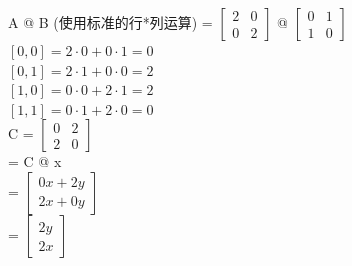 \documentclass[12pt]{article}
\begin{document}
\begin{flushleft}
A @ B (使用标准的行*列运算)
= $\begin{bmatrix}
    2 & 0\\
    0 & 2
\end{bmatrix}$  @ 
$\begin{bmatrix}
    0 & 1 \\
    1 & 0
\end{bmatrix}$ \\
$ [0, 0] = 2 \cdot 0  + 0 \cdot 1 = 0 $ \\
$ [0, 1] = 2 \cdot 1  + 0 \cdot 0 = 2 $ \\
$ [1, 0] = 0 \cdot 0  + 2 \cdot 1 = 2 $ \\
$ [1, 1] = 0 \cdot 1  + 2 \cdot 0 = 0 $ \\
C = $\begin{bmatrix}
    0 & 2 \\
    2 & 0
\end{bmatrix}$ \\
= C @ x  \\
= $\begin{bmatrix}
    0x + 2y \\
    2x + 0y 
\end{bmatrix}$ \\
= $\begin{bmatrix}
    2y \\
    2x 
\end{bmatrix}$ \\
\end{flushleft}
\end{document}
